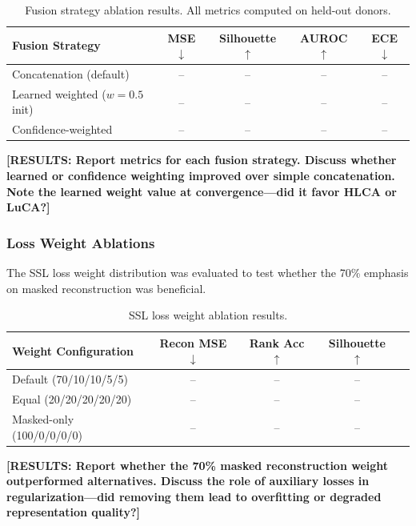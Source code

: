 \begin{table}[h]
\centering
\caption{Fusion strategy ablation results. All metrics computed on held-out donors.}
\label{tab:fusion_ablations}
\begin{tabular}{lcccc}
\toprule
\textbf{Fusion Strategy} & \textbf{MSE} $\downarrow$ & \textbf{Silhouette} $\uparrow$ & \textbf{AUROC} $\uparrow$ & \textbf{ECE} $\downarrow$ \\
\midrule
Concatenation (default) & -- & -- & -- & -- \\
Learned weighted ($w=0.5$ init) & -- & -- & -- & -- \\
Confidence-weighted & -- & -- & -- & -- \\
\bottomrule
\end{tabular}
\end{table}

\textbf{[RESULTS: Report metrics for each fusion strategy. Discuss whether learned or confidence weighting improved over simple concatenation. Note the learned weight value at convergence---did it favor HLCA or LuCA?]}


\subsubsection{Loss Weight Ablations}

The SSL loss weight distribution was evaluated to test whether the 70\% emphasis on masked reconstruction was beneficial.

\begin{table}[h]
\centering
\caption{SSL loss weight ablation results.}
\label{tab:loss_weight_ablations}
\begin{tabular}{lcccc}
\toprule
\textbf{Weight Configuration} & \textbf{Recon MSE} $\downarrow$ & \textbf{Rank Acc} $\uparrow$ & \textbf{Silhouette} $\uparrow$ \\
\midrule
Default (70/10/10/5/5) & -- & -- & -- \\
Equal (20/20/20/20/20) & -- & -- & -- \\
Masked-only (100/0/0/0/0) & -- & -- & -- \\
\bottomrule
\end{tabular}
\end{table}

\textbf{[RESULTS: Report whether the 70\% masked reconstruction weight outperformed alternatives. Discuss the role of auxiliary losses in regularization---did removing them lead to overfitting or degraded representation quality?]}


